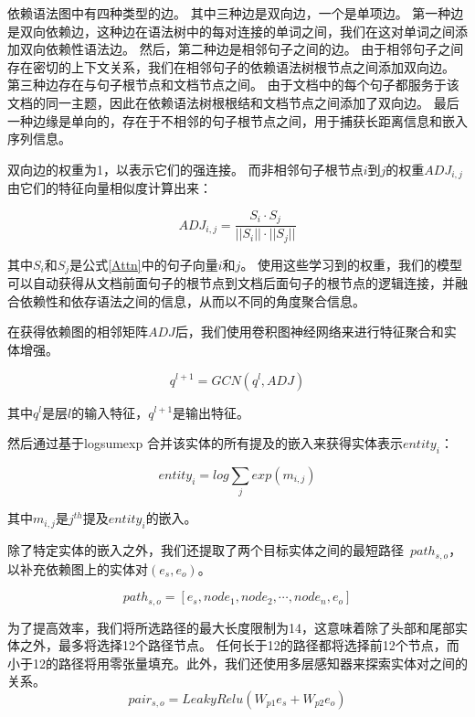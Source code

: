 \documentclass[bachelor]{thesis-uestc}
\begin{document}
依赖语法图中有四种类型的边。
其中三种边是双向边，一个是单项边。
第一种边是双向依赖边，这种边在语法树中的每对连接的单词之间，我们在这对单词之间添加双向依赖性语法边。
然后，第二种边是相邻句子之间的边。
由于相邻句子之间存在密切的上下文关系，我们在相邻句子的依赖语法树根节点之间添加双向边。
第三种边存在与句子根节点和文档节点之间。
由于文档中的每个句子都服务于该文档的同一主题，因此在依赖语法树根根结和文档节点之间添加了双向边。
最后一种边缘是单向的，存在于不相邻的句子根节点之间，用于捕获长距离信息和嵌入序列信息。\par
双向边的权重为1，以表示它们的强连接。
而非相邻句子根节点$i$到$j$的权重$ADJ_{i, j}$由它们的特征向量相似度计算出来：

\begin{equation}\label{edge weight}
    ADJ_{i,j} = \frac{S_i \cdot S_j}{||S_i|| \cdot ||S_j||}
\end{equation}

其中$S_i$和$S_j$是公式\ref{Attn}中的句子向量$i$和$j$。
使用这些学习到的权重，我们的模型可以自动获得从文档前面句子的根节点到文档后面句子的根节点的逻辑连接，并融合依赖性和依存语法之间的信息，从而以不同的角度聚合信息。
\par

在获得依赖图的相邻矩阵$ADJ$后，我们使用卷积图神经网络来进行特征聚合和实体增强。

\begin{equation}
    q^{l+1} = GCN(q^{l}, ADJ)
\end{equation}

其中$q^l$是层$l$的输入特征，$q^{l+1}$是输出特征。\par
然后通过基于logsumexp \cite{jia-etal-2019-document}合并该实体的所有提及的嵌入来获得实体表示$entity_i$：

\begin{equation}\label{logsumexp}
    entity_i =  log \sum_{j} exp(m_{i,j})
\end{equation}

其中$m_{i, j}$是$j^{th}$提及$entity_i$的嵌入。\par
除了特定实体的嵌入之外，我们还提取了两个目标实体之间的最短路径\ $path_{s, o}$，以补充依赖图上的实体对$(e_s,e_o)$。

\begin{equation}
    path_{s,o} = [ e_s, node_1, node_2, \cdots, node_n, e_o ]
\end{equation}

为了提高效率，我们将所选路径的最大长度限制为14，这意味着除了头部和尾部实体之外，最多将选择12个路径节点。
任何长于12的路径都将选择前12个节点，而小于12的路径将用零张量填充。此外，我们还使用多层感知器来探索实体对之间的关系。
\begin{equation}
    pair_{s,o} = LeakyRelu(W_{p1}e_s + W_{p2}e_o)
\end{equation}
\par
\end{document}
